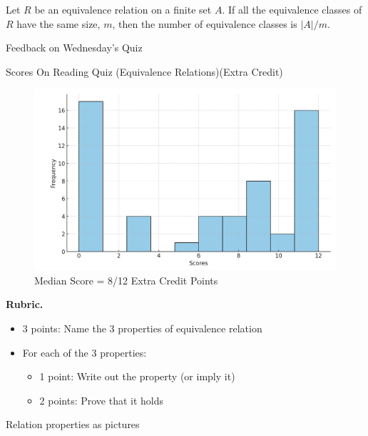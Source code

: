 \documentclass[10pt]{beamer}
\begin{document}
\begin{frame}
 \begin{mygreenbox}[title=\text{Theorem: Counting Equivalence Classes (Scheinerman Thm 16.6)}]  
Let $R$ be an equivalence relation on a finite set $A$. If all the equivalence classes of $R$ have the same size, $m$, then the number of equivalence classes is $|A|/m$. 
\end{mygreenbox}

\end{frame}


\begin{frame}[standout]
Feedback on Wednesday's Quiz 
\end{frame}



\begin{frame}{Scores On Reading Quiz (Equivalence Relations)(Extra Credit)}
\footnotesize 
\begin{figure}[ht]
        \centering
        \includegraphics[width=.7\textwidth]{images/reading_quiz_scores}
   		 \caption{Median Score = 8/12 Extra Credit Points}
\end{figure}
\vfill 
\textbf{Rubric.}  	
\begin{itemize}
\item 3 points: Name the 3 properties of equivalence relation
\item For each of the 3 properties:
\begin{itemize} \footnotesize 
\item 1 point: Write out the property (or imply it)
\item 2 points: Prove that it holds
\end{itemize}
\end{itemize}
\end{frame}

\begin{frame}[standout]
Relation properties as pictures
\end{frame}
\end{document}
